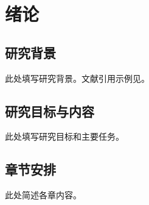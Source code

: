 \chapter{绪论}
\label{chap:introduction}

\section{研究背景}
此处填写研究背景。文献引用示例见\cite{lamport1994latex}。

\section{研究目标与内容}
此处填写研究目标和主要任务。

\section{章节安排}
此处简述各章内容。
